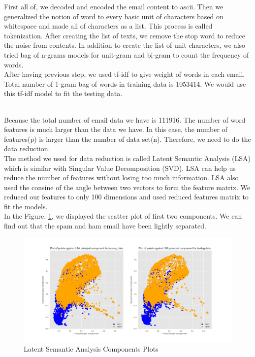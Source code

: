 
First all of, we decoded and encoded the email content to ascii. Then we generalized the notion of word to every basic unit of characters based on whitespace and made all of characters as a list. This process is called tokenization. After creating the list of texts, we remove the stop word to reduce the noise from contents. In addition to create the list of unit characters, we also tried bag of n-grams models for unit-gram and bi-gram to count the frequency of words.\\

After having previous step, we used tf-idf to give weight of words in each email. Total number of 1-gram bag of words in training data is 1053414. We would use this tf-idf model to fit the testing data. \\\

Because the total number of email data we have is 111916. The number of word features is much larger than the data we have. In this case, the number of features(p) is larger than the number of data set(n). Therefore, we need to do the data reduction.\\

The method we used for data reduction is called Latent Semantic Analysis (LSA) which is similar with Singular Value Decomposition (SVD). LSA can help us reduce the number of features without losing too much information. LSA also used the consine of the angle between two vectors to form the feature matrix. We reduced our features to only 100 dimensions and used reduced features matrix to fit the models.\\

In the Figure. \ref{FE}, we displayed the scatter plot of first two components. We can find out that the spam and ham email have been lightly separated.

\begin{figure}[H]
    \centering
    \includegraphics[scale=0.3]{./plots/data_reduction_cp12.png}
    \caption{Latent Semantic Analysis Components Plots}
    \label{FE}
\end{figure}

